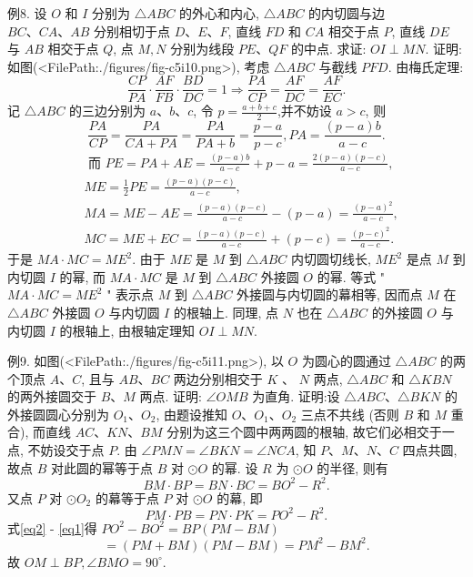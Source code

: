 例8. 设 $O$ 和 $I$ 分别为 $\triangle A B C$ 的外心和内心, $\triangle A B C$ 的内切圆与边 $B C 、 C A 、 A B$ 分别相切于点 $D 、 E 、 F$, 直线 $F D$ 和 $C A$ 相交于点 $P$, 直线 $D E$ 与 $A B$ 相交于点 $Q$, 点 $M, N$ 分别为线段 $P E 、 Q F$ 的中点.
求证: $O I \perp M N$.
证明:如图(<FilePath:./figures/fig-c5i10.png>), 考虑 $\triangle A B C$ 与截线 $P F D$. 由梅氏定理:
$$
\frac{C P}{P A} \cdot \frac{A F}{F B} \cdot \frac{B D}{D C}=1 \Rightarrow \frac{P A}{C P}=\frac{A F}{D C}=\frac{A F}{E C} .
$$
记 $\triangle A B C$ 的三边分别为 $a 、 b 、 c$, 令 $p= \frac{a+b+c}{2}$,并不妨设 $a>c$, 则
$$
\frac{P A}{C P}=\frac{P A}{C A+P A}=\frac{P A}{P A+b}=\frac{p-a}{p-c}, P A=\frac{(p-a) b}{a-c} .
$$
$$
\begin{aligned}
& \text { 而 } P E=P A+A E=\frac{(p-a) b}{a-c}+p-a=\frac{2(p-a)(p-c)}{a-c}, \\
& M E=\frac{1}{2} P E=\frac{(p-a)(p-c)}{a-c}, \\
& M A=M E-A E=\frac{(p-a)(p-c)}{a-c}-(p-a)=\frac{(p-a)^2}{a-c}, \\
& M C=M E+E C=\frac{(p-a)(p-c)}{a-c}+(p-c)=\frac{(p-c)^2}{a-c} .
\end{aligned}
$$
于是 $M A \cdot M C=M E^2$.
由于 $M E$ 是 $M$ 到 $\triangle A B C$ 内切圆切线长, $M E^2$ 是点 $M$ 到内切圆 $I$ 的幂, 而 $M A \cdot M C$ 是 $M$ 到 $\triangle A B C$ 外接圆 $O$ 的幂.
等式 " $M A \cdot M C=M E^2$ " 表示点 $M$ 到 $\triangle A B C$ 外接圆与内切圆的幕相等, 因而点 $M$ 在 $\triangle A B C$ 外接圆 $O$ 与内切圆 $I$ 的根轴上.
同理, 点 $N$ 也在 $\triangle A B C$ 的外接圆 $O$ 与内切圆 $I$ 的根轴上, 由根轴定理知 $O I \perp M N$.



例9. 如图(<FilePath:./figures/fig-c5i11.png>), 以 $O$ 为圆心的圆通过 $\triangle A B C$ 的两个顶点 $A 、 C$, 且与 $A B 、 B C$ 两边分别相交于 $K$ 、 $N$ 两点, $\triangle A B C$ 和 $\triangle K B N$ 的两外接圆交于 $B 、 M$ 两点.
证明: $\angle O M B$ 为直角.
证明:设 $\triangle A B C 、 \triangle B K N$ 的外接圆圆心分别为 $O_1 、 O_2$, 由题设推知 $O 、 O_1 、 O_2$ 三点不共线 (否则 $B$ 和 $M$ 重合), 而直线 $A C 、 K N 、 B M$ 分别为这三个圆中两两圆的根轴, 故它们必相交于一点, 不妨设交于点 $P$.
由 $\angle P M N=\angle B K N=\angle N C A$, 知 $P 、 M 、 N 、 C$ 四点共圆, 故点 $B$ 对此圆的幂等于点 $B$ 对 $\odot O$ 的幂.
设 $R$ 为 $\odot O$ 的半径, 则有
$$
B M \cdot B P=B N \cdot B C=B O^2-R^2 . \label{eq1}
$$
又点 $P$ 对 $\odot O_2$ 的幕等于点 $P$ 对 $\odot O$ 的幕, 即
$$
P M \cdot P B=P N \cdot P K=P O^2-R^2 . \label{eq2}
$$
式\ref{eq2} - \ref{eq1}得 $P O^2-B O^2=B P(P M-B M)$
$$
=(P M+B M)(P M-B M)=P M^2-B M^2 .
$$
故 $O M \perp B P, \angle B M O=90^{\circ}$.



